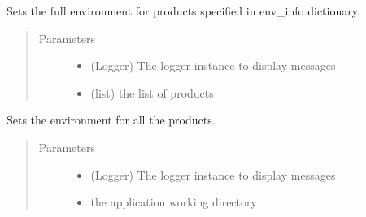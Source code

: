\documentclass[a4paper,10pt,english]{sphinxmanual}
\begin{document}
\begin{fulllineitems}
\begin{fulllineitems}
\label{\detokenize{apidoc_src/src:src.environment.SalomeEnviron.set_full_environ}}
Sets the full environment for products 
specified in env\_info dictionary.
\begin{quote}\begin{description}
\item[{Parameters}] \leavevmode\begin{itemize}
\item {} 
 \textendash{} (Logger) The logger instance to display messages

\item {} 
 \textendash{} (list) the list of products

\end{itemize}

\end{description}\end{quote}

\end{fulllineitems}


\begin{fulllineitems}
\label{\detokenize{apidoc_src/src:src.environment.SalomeEnviron.set_products}}
Sets the environment for all the products.
\begin{quote}\begin{description}
\item[{Parameters}] \leavevmode\begin{itemize}
\item {} 
 \textendash{} (Logger) The logger instance to display messages

\item {} 
 \textendash{} the application working directory

\end{itemize}

\end{description}\end{quote}


\end{fulllineitems}
\end{fulllineitems}
\end{document}
